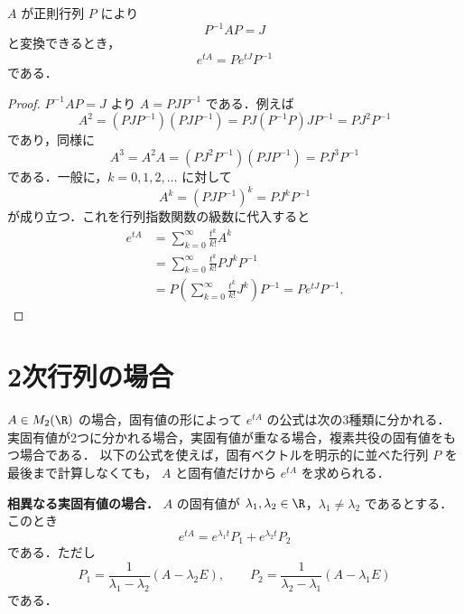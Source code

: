 \documentclass[article,paper=a4paper]{jlreq}
\begin{document}
\begin{prop}
$A$ が正則行列 $P$ により
\[
  P^{-1}AP=J
\]
と変換できるとき，
\[
  e^{tA}=Pe^{tJ}P^{-1}
\]
である．
\end{prop}

\begin{proof}
$P^{-1}AP=J$ より $A=PJP^{-1}$ である．例えば
\[
  A^2
    =
    (PJP^{-1})(PJP^{-1})
    =
    PJ(P^{-1}P)JP^{-1}
    =
    PJ^2P^{-1}
\]
であり，同様に
\[
  A^3
    =
    A^2A
    =
    (PJ^2P^{-1})(PJP^{-1})
    =
    PJ^3P^{-1}
\]
である．一般に，$k=0,1,2,\ldots$ に対して
\[
  A^k=(PJP^{-1})^k=P J^k P^{-1}
\]
が成り立つ．これを行列指数関数の級数に代入すると
\begin{align*}
  e^{tA}
    &=
    \sum_{k=0}^{\infty}\frac{t^k}{k!}A^k\\
    &=
    \sum_{k=0}^{\infty}\frac{t^k}{k!}P J^k P^{-1}\\
    &=
    P\left(\sum_{k=0}^{\infty}\frac{t^k}{k!}J^k\right)P^{-1}
     =
    Pe^{tJ}P^{-1}.
\end{align*}
\end{proof}

\section{2次行列の場合}

$A\in M_2(\R)$ の場合，固有値の形によって $e^{tA}$ の公式は次の3種類に分かれる．
実固有値が2つに分かれる場合，実固有値が重なる場合，複素共役の固有値をもつ場合である．
以下の公式を使えば，固有ベクトルを明示的に並べた行列 $P$ を最後まで計算しなくても，
$A$ と固有値だけから $e^{tA}$ を求められる．

\begin{prop}
\textbf{相異なる実固有値の場合．}
$A$ の固有値が $\lambda_1,\lambda_2\in\R$，$\lambda_1\ne\lambda_2$ であるとする．このとき
\[
  e^{tA}
    =
    e^{\lambda_1t}P_1+e^{\lambda_2t}P_2
\]
である．ただし
\[
  P_1=\frac{1}{\lambda_1-\lambda_2}(A-\lambda_2E),
  \qquad
  P_2=\frac{1}{\lambda_2-\lambda_1}(A-\lambda_1E)
\]
である．
\end{prop}
\end{document}
